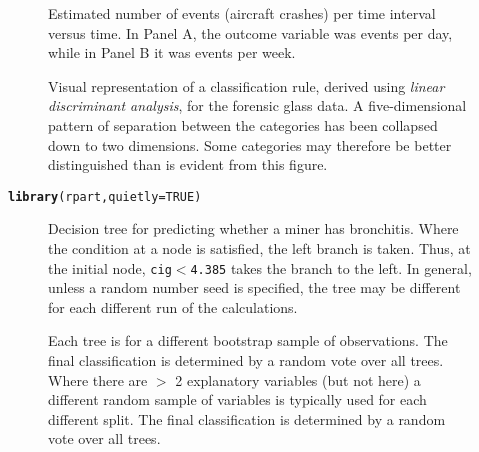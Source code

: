 \documentclass[12pt, a4paper,  BCOR=8.25mm, DIV=15]{scrartcl}\usepackage[]{graphicx}\usepackage[]{color}
\makeatletter
\newcommand{\hlnum}[1]{\textcolor[rgb]{0.686,0.059,0.569}{#1}}%
\newcommand{\hlstd}[1]{\textcolor[rgb]{0.345,0.345,0.345}{#1}}%
\newcommand{\hlkwc}[1]{\textcolor[rgb]{0.333,0.667,0.333}{#1}}%
\newcommand{\hlkwd}[1]{\textcolor[rgb]{0.737,0.353,0.396}{\textbf{#1}}}%
\newenvironment{kframe}{%
 \def\at@end@of@kframe{}%
 \ifinner\ifhmode%
  \def\at@end@of@kframe{\end{minipage}}%
  \begin{minipage}{\columnwidth}%
 \fi\fi%
 \def\FrameCommand##1{\hskip\@totalleftmargin \hskip-\fboxsep
 \colorbox{shadecolor}{##1}\hskip-\fboxsep
     \hskip-\linewidth \hskip-\@totalleftmargin \hskip\columnwidth}%
 \MakeFramed {\advance\hsize-\width
   \@totalleftmargin\z@ \linewidth\hsize
   \@setminipage}}%
 {\par\unskip\endMakeFramed%
 \at@end@of@kframe}
\newenvironment{knitrout}{}{} %
\newcommand{\txtt}[1]{{\texttt{#1}}}
\makeatother
\begin{document}
\begin{figure*}[h]

\caption{Estimated number of events (aircraft crashes) per time
  interval versus time.  In Panel A, the outcome variable was events
  per day, while in Panel B it was events per
  week.\label{fig:planeCrash}}
\end{figure*}

\begin{figure}

\caption{Visual representation of a classification rule, derived using
  {\em linear discriminant analysis}, for the forensic glass data.  A
  five-dimensional pattern of separation between the categories has
  been collapsed down to two dimensions.  Some categories may therefore
be better distinguished than is evident from this figure.
}
\label{fig:fgl}
\end{figure}

\begin{knitrout}
\color{fgcolor}\begin{kframe}
\begin{alltt}
\hlkwd{library}\hlstd{(rpart,} \hlkwc{quietly}\hlstd{=}\hlnum{TRUE}\hlstd{)}
\end{alltt}
\end{kframe}
\end{knitrout}

\begin{figure}

\caption{Decision tree for predicting whether a miner has
    bronchitis.  Where the condition at a node is satisfied, the left
    branch is taken. Thus, at the initial node, \txtt{cig$<$4.385}
    takes the branch to the left.  In general, unless a random number
    seed is specified, the tree may be different for each different run of the
    calculations.
}\label{fig:tree}
\end{figure}

\begin{figure}

\caption{Each tree is for a different bootstrap sample of
  observations.  The final classification is determined by a random
  vote over all trees.  Where there are $>$ 2 explanatory variables
  (but not here) a different random sample of variables is typically
  used for each different split. The final classification is
  determined by a random vote over all trees.}\label{fig:brontrees}
\end{figure}
\end{document}
